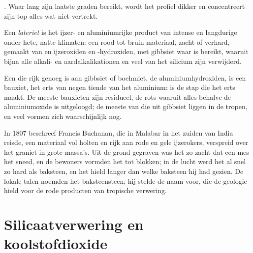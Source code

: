 \emph{.} Waar  lang zijn laatste graden bereikt, wordt het profiel dikker en concentreert zijn top alles wat niet vertrekt.

\begin{definition}[Lateriet]\label{def:b1:weathering-clays:laterite}
Een \emph{lateriet} is het ijzer- en aluminiumrijke product van intense en langdurige  onder hete, natte klimaten: een rood tot bruin materiaal, zacht of verhard, gemaakt van  en ijzeroxiden en -hydroxiden, met gibbsiet waar  is bereikt, waaruit bijna alle alkali- en aardalkalikationen en veel van het silicium zijn verwijderd.
\end{definition}

Een  die rijk genoeg is aan gibbsiet of boehmiet, de aluminiumhydroxiden, is een bauxiet, het erts van negen tiende van het aluminium:  is de stap die het erts maakt. De meeste bauxieten zijn residueel, de rots waaruit alles behalve de aluminiumoxide is uitgeloogd; de meeste van die uit gibbsiet liggen in de tropen, en veel vormen zich waarschijnlijk nog.

\begin{history}
In 1807 beschreef Francis Buchanan, die in Malabar in het zuiden van India reisde, een materiaal vol holten en rijk aan rode en gele ijzerokers, verspreid over het graniet in grote massa's. Uit de grond gegraven was het zo zacht dat een mes het sneed, en de bewoners vormden het tot blokken; in de lucht werd het al snel zo hard als baksteen, en het hield langer dan welke baksteen hij had gezien. De lokale talen noemden het baksteensteen; hij stelde de naam  voor, die de geologie hield voor de rode producten van tropische verwering.
\end{history}

\section{Silicaatverwering en koolstofdioxide}\label{sec:b1:weathering-clays:co2}

